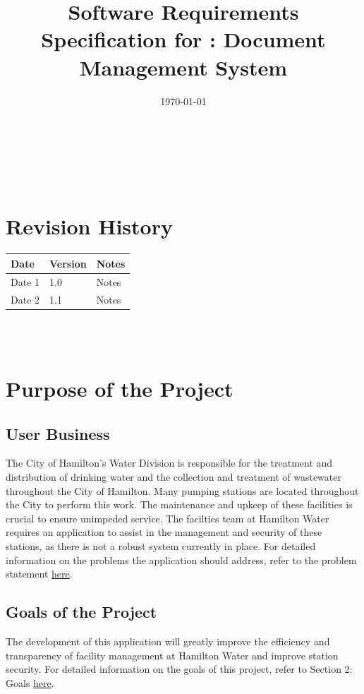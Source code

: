 \documentclass[12pt]{article}
\begin{document}
\title{Software Requirements Specification for \progname: Document Management System} 
\author{\authname}
\date{\today}
	
\maketitle

~\newpage


\tableofcontents

~\newpage

\section*{Revision History}

\begin{tabularx}{\textwidth}{p{3cm}p{2cm}X}
\toprule {\textbf{Date}} & {\textbf{Version}} & {\textbf{Notes}}\\
\midrule
Date 1 & 1.0 & Notes\\
Date 2 & 1.1 & Notes\\
\bottomrule
\end{tabularx}

~\\

~\newpage
\section{Purpose of the Project}
\subsection{User Business}
The City of Hamilton's Water Division is responsible for the treatment and distribution of drinking water
and the collection and treatment of wastewater throughout the City of Hamilton.
Many pumping stations are located throughout the City to perform this work. The maintenance and upkeep of these
facilities is crucial to ensure unimpeded service. The facilties team at Hamilton Water requires an application
to assist in the management and security of these stations, as there is not a robust system currently in place.
For detailed information on the problems the application should address, refer to the problem statement \href{https://github.com/Spitgranger/capstone/blob/main/docs/ProblemStatementAndGoals/ProblemStatement.pdf}{here}.
\subsection{Goals of the Project}
The development of this application will greatly improve the efficiency and transparency of
facility management at Hamilton Water and improve station security. For detailed information on the
goals of this project, refer to Section 2: Goals \href{https://github.com/Spitgranger/capstone/blob/main/docs/ProblemStatementAndGoals/ProblemStatement.pdf}{here}.
\end{document}
